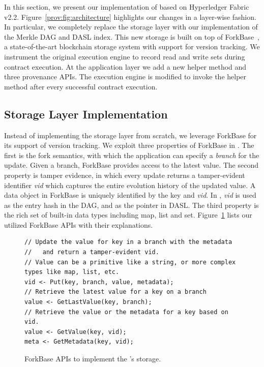 In this section, we present our implementation of {\fs} based on Hyperledger Fabric v2.2. 
Figure~\ref{prov:fig:architecture} highlights our changes in a layer-wise fashion. 
In particular, we completely
replace the storage layer with our implementation of the Merkle DAG and DASL index. This new storage
is built on top of ForkBase~\cite{wang2018forkbase}, a state-of-the-art blockchain storage system
with support for version tracking.  We instrument the original execution engine to record read and write sets
during contract execution. At the application layer we add a new helper method and three provenance APIs. The
execution engine is modified to invoke the helper method after every successful contract execution.  


\subsection{Storage Layer Implementation}
Instead of implementing the storage layer from scratch, we leverage ForkBase for its support of version
tracking.  We exploit three properties of ForkBase in {\fs}. The first is the fork semantics, with which
the application can specify a \textit{branch} for the update. Given
a branch, ForkBase provides access to the latest value.  The second property is tamper evidence, in which
every update returns a tamper-evident identifier {\em vid} which captures the entire evolution history of the
updated value. A data object in ForkBase is uniquely identified by the key and {\em vid}. In {\fs}, {\em
vid} is used as the entry hash in the DAG, and as the pointer in DASL. The third property is the rich set of
built-in data types including map, list and set. 
Figure~\ref{prov:code:api} lists our utilized ForkBase APIs with their explanations. 

\begin{figure}
\centering
\footnotesize
\begin{verbatim}
// Update the value for key in a branch with the metadata 
//   and return a tamper-evident vid. 
// Value can be a primitive like a string, or more complex types like map, list, etc. 
vid <- Put(key, branch, value, metadata);
// Retrieve the latest value for a key on a branch
value <- GetLastValue(key, branch);
// Retrieve the value or the metadata for a key based on vid. 
value <- GetValue(key, vid);
meta <- GetMetadata(key, vid);
\end{verbatim}
\caption{ForkBase APIs to implement the {\fs}'s storage. }
\label{prov:code:api}
\end{figure}

